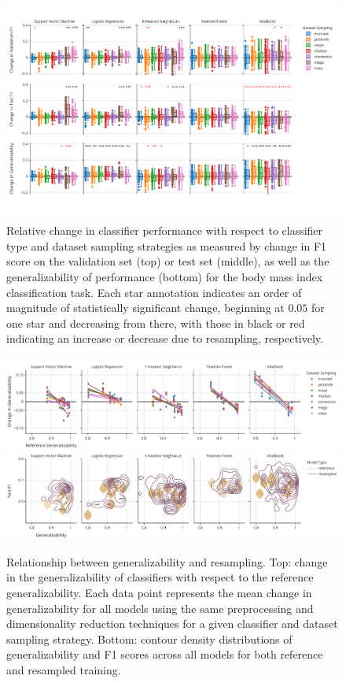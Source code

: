 \documentclass[10pt]{SelfArx} %
\begin{document}
\begin{figure}[htbp]\centering
\includegraphics[width=0.8\linewidth]{figures/1_app.pdf}
\caption{Relative change in classifier performance with respect to classifier type and dataset sampling strategies as
measured by change in F1 score on the validation set (top) or test set (middle), as well as the generalizability of
performance (bottom) for the body mass index classification task. Each star annotation indicates an order of magnitude
of statistically significant change, beginning at $0.05$ for one star and decreasing from there, with those in black or
red indicating an increase or decrease due to resampling, respectively.}
\label{fig:overall_perf_app}
\end{figure}

\begin{figure}[hbtp]\centering
\includegraphics[width=0.8\linewidth]{figures/2a_app.pdf}
\includegraphics[width=0.8\linewidth]{figures/2b_app.pdf}
\caption{Relationship between generalizability and resampling. Top: change in the generalizability of classifiers with
respect to the reference generalizability. Each data point represents the mean change in generalizability for all
models using the same preprocessing and dimensionality reduction techniques for a given classifier and dataset sampling
strategy. Bottom: contour density distributions of generalizability and F1 scores across all models for both reference
and resampled training.
}
\label{fig:change_in_gen_app}
\end{figure}
\end{document}
